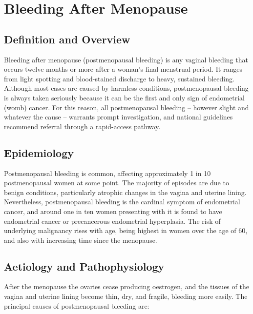 \chapter{Bleeding After Menopause}

\section*{Definition and Overview}
Bleeding after menopause (postmenopausal bleeding) is any vaginal bleeding that occurs twelve months or more after a woman's final menstrual period. It ranges from light spotting and blood-stained discharge to heavy, sustained bleeding. Although most cases are caused by harmless conditions, postmenopausal bleeding is always taken seriously because it can be the first and only sign of endometrial (womb) cancer. For this reason, all postmenopausal bleeding -- however slight and whatever the cause -- warrants prompt investigation, and national guidelines recommend referral through a rapid-access pathway.

\section*{Epidemiology}
Postmenopausal bleeding is common, affecting approximately 1 in 10 postmenopausal women at some point. The majority of episodes are due to benign conditions, particularly atrophic changes in the vagina and uterine lining. Nevertheless, postmenopausal bleeding is the cardinal symptom of endometrial cancer, and around one in ten women presenting with it is found to have endometrial cancer or precancerous endometrial hyperplasia. The risk of underlying malignancy rises with age, being highest in women over the age of 60, and also with increasing time since the menopause.

\section*{Aetiology and Pathophysiology}
After the menopause the ovaries cease producing oestrogen, and the tissues of the vagina and uterine lining become thin, dry, and fragile, bleeding more easily. The principal causes of postmenopausal bleeding are:


